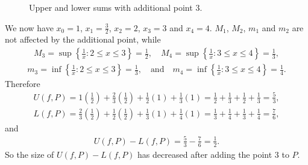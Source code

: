 \documentclass[letterpaper,10pt,english]{jupyterBook}
\let\sphinxpxdimen\pdfpxdimen\else\newdimen\sphinxpxdimen
\begin{document}
\begin{figure}[htbp]
\centering
\capstart

\noindent\sphinxincludegraphics[width=600\sphinxpxdimen]{{int1ii}.png}
\caption{Upper and lower sums with additional point \(3\).}\label{\detokenize{Solutions-full:q64ii}}\end{figure}

\sphinxAtStartPar
We now have \(x_0=1\), \(x_1=\frac{3}{2}\), \(x_2=2\), \(x_3=3\) and \(x_4=4\). \(M_1\), \(M_2\), \(m_1\) and \(m_2\) are not affected by the additional point, while
\begin{equation*}
\begin{split}
M_3 = \sup\left\{\frac{1}{x}:2\leq x\leq 3\right\}=\frac{1}{2},\hspace{1em} M_4 =\sup\left\{\frac{1}{x}:3\leq x\leq 4\right\}=\frac{1}{3},
\end{split}
\end{equation*}\begin{equation*}
\begin{split}
m_3 = \inf\left\{\frac{1}{x}:2\leq x\leq 3\right\}=\frac{1}{3}, \hspace{1em} \text{and} \hspace{1em} m_4 =\inf\left\{\frac{1}{x}:3\leq x\leq 4\right\}=\frac{1}{4}.
\end{split}
\end{equation*}
\sphinxAtStartPar
Therefore
\begin{equation*}
\begin{split}
U(f,P) = 1\left(\frac{1}{2}\right) + \frac{2}{3}\left(\frac{1}{2}\right) + \frac{1}{2}(1) + \frac{1}{3}(1) = \frac{1}{2}+\frac{1}{3}+\frac{1}{2}+\frac{1}{3} = \frac{5}{3},
\end{split}
\end{equation*}\begin{equation*}
\begin{split}
L(f,P) = \frac{2}{3}\left(\frac{1}{2}\right) + \frac{1}{2}\left(\frac{1}{2}\right) + \frac{1}{3}(1) + \frac{1}{4}(1) = \frac{1}{3}+\frac{1}{4}+\frac{1}{3}+\frac{1}{4} = \frac{7}{6},
\end{split}
\end{equation*}
\sphinxAtStartPar
and
\begin{equation*}
\begin{split}
U(f,P) - L(f,P) = \frac{5}{3}-\frac{7}{6} = \frac{1}{2}.
\end{split}
\end{equation*}
\sphinxAtStartPar
So the size of \(U(f,P)-L(f,P)\) has decreased after adding the point \(3\) to \(P\).
\end{document}
